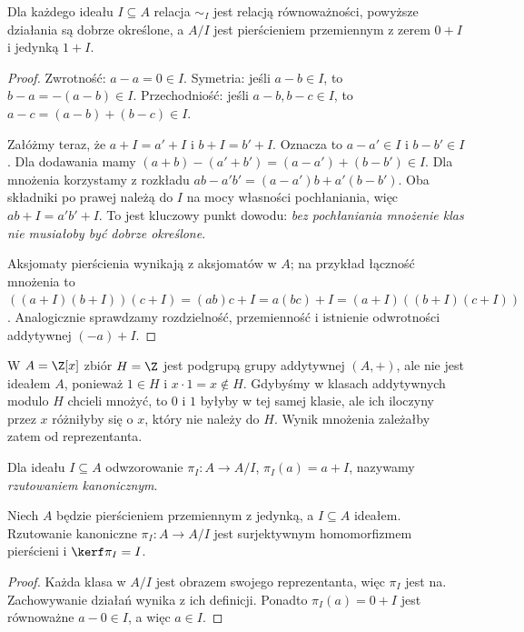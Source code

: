 \begin{twierdzenie}
\label{tw:iloraz}
Dla każdego ideału $I\subseteq A$ relacja $\sim_I$ jest relacją
równoważności, powyższe działania są dobrze określone,
a $A/I$ jest pierścieniem przemiennym z zerem $0+I$
i jedynką $1+I$.
\end{twierdzenie}
\begin{proof}
Zwrotność: $a-a=0\in I$.
Symetria: jeśli $a-b\in I$, to $b-a=-(a-b)\in I$.
Przechodniość: jeśli $a-b,b-c\in I$, to
$a-c=(a-b)+(b-c)\in I$.

Załóżmy teraz, że $a+I=a'+I$ i $b+I=b'+I$.
Oznacza to $a-a'\in I$ i $b-b'\in I$.
Dla dodawania mamy
$(a+b)-(a'+b')=(a-a')+(b-b')\in I$.
Dla mnożenia korzystamy z rozkładu
$ab-a'b'=(a-a')b+a'(b-b')$.
Oba składniki po prawej należą do $I$ na mocy własności pochłaniania,
więc $ab+I=a'b'+I$. To jest kluczowy punkt dowodu:
\emph{bez pochłaniania mnożenie klas nie musiałoby być dobrze określone}.

Aksjomaty pierścienia wynikają z aksjomatów w $A$;
na przykład łączność mnożenia to
$((a+I)(b+I))(c+I)=(ab)c+I=a(bc)+I
=(a+I)((b+I)(c+I))$.
Analogicznie sprawdzamy rozdzielność, przemienność i istnienie
odwrotności addytywnej $(-a)+I$.
\end{proof}

\begin{przyklad}
W $A=\Z[x]$ zbiór $H=\Z$ jest podgrupą grupy addytywnej $(A,+)$,
ale nie jest ideałem $A$, ponieważ $1\in H$ i $x\cdot1=x\notin H$.
Gdybyśmy w klasach addytywnych modulo $H$ chcieli mnożyć,
to $0$ i $1$ byłyby w tej samej klasie, ale ich iloczyny przez $x$
różniłyby się o $x$, który nie należy do $H$.
Wynik mnożenia zależałby zatem od reprezentanta.
\end{przyklad}

\begin{definicja}
Dla ideału $I\subseteq A$ odwzorowanie
$\pi_I\colon A\to A/I$, $\pi_I(a)=a+I$,
nazywamy \emph{rzutowaniem kanonicznym}.
\end{definicja}

\begin{stwierdzenie}
Niech $A$ będzie pierścieniem przemiennym z jedynką, a $I\subseteq A$
ideałem. Rzutowanie kanoniczne $\pi_I:A\to A/I$ jest
surjektywnym homomorfizmem pierścieni i $\kerf\pi_I=I$.
\end{stwierdzenie}
\begin{proof}
Każda klasa w $A/I$ jest obrazem swojego reprezentanta,
więc $\pi_I$ jest na. Zachowywanie działań wynika z ich definicji.
Ponadto $\pi_I(a)=0+I$ jest równoważne $a-0\in I$,
a więc $a\in I$.
\end{proof}

